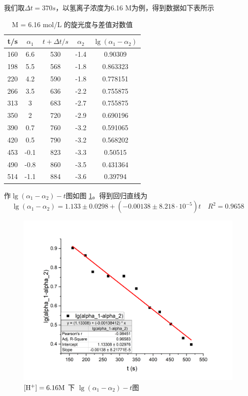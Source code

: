 \documentclass[cn,hazy,pku,12pt,normal,math=newtx,cite=super]{elegantnote}
\begin{document}
我们取$\Delta t=370s$，以氢离子浓度为6.16 M为例，得到数据如下表所示

\begin{table}[h]
    \centering
    \caption{ M = 6.16 mol/L 的旋光度与差值对数值}
    \label{19}
    \begin{tabular}{ccccc}
    \hline
    t/s & $\alpha_1$ & $t+\Delta t/s$ & $\alpha_2$ & $\lg(\alpha_1-\alpha_2)$ \\ \hline
    160 & 6.6        & 530            & -1.4       & 0.90309                  \\
    198 & 5.5        & 568            & -1.8       & 0.863323                 \\
    220 & 4.2        & 590            & -1.8       & 0.778151                 \\
    266 & 3.5        & 636            & -2.2       & 0.755875                 \\
    313 & 3          & 683            & -2.7       & 0.755875                 \\
    350 & 2          & 720            & -2.9       & 0.690196                 \\
    390 & 0.7        & 760            & -3.2       & 0.591065                 \\
    420 & 0.5        & 790            & -3.2       & 0.568202                 \\
    453 & -0.1       & 823            & -3.3       & 0.50515                  \\
    490 & -0.8       & 860            & -3.5       & 0.431364                 \\
    514 & -1.1       & 884            & -3.6       & 0.39794                  \\ \hline
    \end{tabular}
\end{table}

作$\lg(\alpha_1-\alpha_2) - t$图如图 \ref{14}。得到回归直线为
$$
\lg(\alpha_1-\alpha_2) = 1.133 \pm 0.0298 + (-0.00138 \pm 8.218\cdot10^{-5}) t \quad R^2=0.9658
$$

\begin{figure}[h]
    \centering
    \includegraphics[width = .70\textwidth]{image/Graph15.png}
    \caption{$\rm [H^+]=6.16M$ 下 $\lg(\alpha_1-\alpha_2) - t$图}\label{14}
\end{figure}
\end{document}
